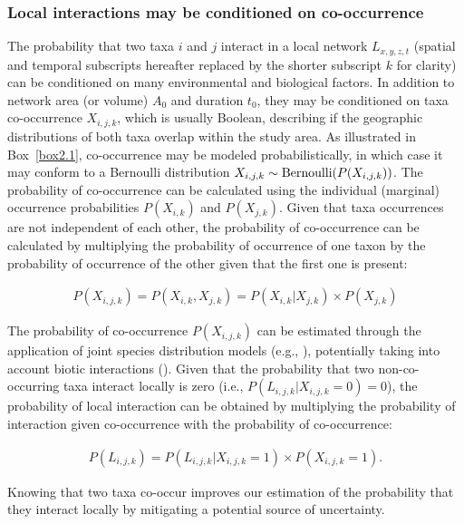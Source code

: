 \subsubsection{Local interactions may be conditioned on co-occurrence}

The probability that two taxa $i$ and $j$ interact in a local network
$L_{x,y,z,t}$ (spatial and temporal subscripts hereafter replaced by the shorter
subscript $k$ for clarity) can be conditioned on many environmental and
biological factors. In addition to network area (or volume) $A_0$ and duration
$t_0$, they may be conditioned on taxa co-occurrence $X_{i,j,k}$, which is
usually Boolean, describing if the geographic distributions of both taxa overlap
within the study area. As illustrated in Box~\ref{box2.1}, co-occurrence may be
modeled probabilistically, in which case it may conform to a Bernoulli
distribution $X_{i,j,k} \sim {\rm Bernoulli}(P(X_{i,j,k}))$. The probability of
co-occurrence can be calculated using the individual (marginal) occurrence
probabilities $P(X_{i,k})$ and $P(X_{j,k})$. Given that taxa occurrences are not
independent of each other, the probability of co-occurrence can be calculated by
multiplying the probability of occurrence of one taxon by the probability of
occurrence of the other given that the first one is present: 

\begin{eqnarray}
  \label{eq:modelcoprob}
     P(X_{i,j,k}) = P(X_{i,k}, X_{j,k})= P(X_{i,k} | X_{j,k}) \times P(X_{j,k})
\end{eqnarray}

The probability of co-occurrence $P(X_{i,j,k})$ can be estimated through the
application of joint species distribution models (e.g.,
\cite{Pollock2014Understanding}), potentially taking into account biotic
interactions (\cite{Staniczenko2017Linking}). Given that the probability that
two non-co-occurring taxa interact locally is zero (i.e., $P(L_{i, j, k}|
X_{i,j,k} = 0) = 0$), the probability of local interaction can be obtained by
multiplying the probability of interaction given co-occurrence with the
probability of co-occurrence: 

\begin{eqnarray}
  \label{eq:co-occur}
    P(L_{i, j, k}) = P(L_{i, j, k}| X_{i,j,k} = 1) \times P(X_{i,j,k} = 1).
\end{eqnarray}

Knowing that two taxa co-occur improves our estimation of the probability that
they interact locally by mitigating a potential source of uncertainty.

